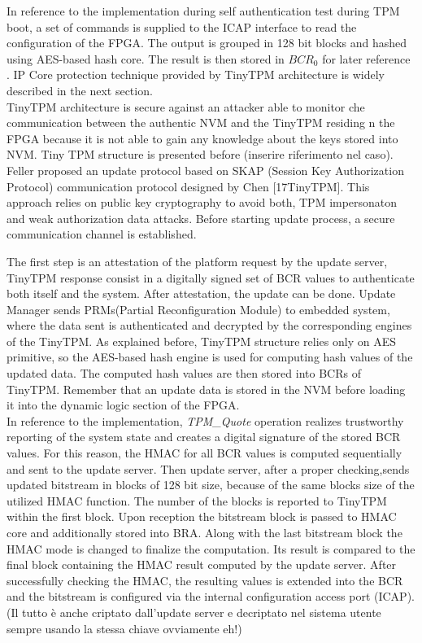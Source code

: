 \documentclass[../tesi.tex]{subfiles}
\begin{document}
{In reference to the implementation during self authentication test during TPM boot, a set of commands is supplied to the ICAP interface to read the configuration of the FPGA. The output is grouped in 128 bit blocks and hashed using AES-based hash core. The result is then stored in $BCR_0$ for later reference\\. 
IP Core protection technique provided by TinyTPM architecture is widely described in the next section. \\
TinyTPM architecture is secure against an attacker able to monitor che communication between the authentic NVM and the TinyTPM residing n the FPGA because it is not able to gain any knowledge about the keys stored into NVM. 
Tiny TPM structure is presented before (inserire riferimento nel caso). Feller proposed an update protocol based on SKAP (Session Key Authorization Protocol) communication protocol designed by Chen [17TinyTPM]. This approach relies on public key cryptography to avoid both, TPM impersonaton and weak authorization data attacks. Before starting update process, a secure communication channel is established. 

The first step is an attestation of the platform request by the update server, TinyTPM response consist in a digitally signed set of BCR values to authenticate both itself and the system. After attestation, the update can be done. Update Manager sends PRMs(Partial Reconfiguration Module) to embedded system, where the data sent is authenticated and decrypted by the corresponding engines of the TinyTPM. As explained before, TinyTPM structure relies only on AES primitive, so the AES-based hash engine is used for computing hash values of the updated data. The computed hash values are then stored into BCRs of TinyTPM. Remember that an update data is stored in the NVM before loading it into the dynamic logic section of the FPGA. \\
In reference to the implementation, \emph{TPM\_Quote} operation realizes trustworthy reporting of the system state and creates a digital signature of  the stored BCR values. For this reason, the HMAC for all BCR values is computed sequentially and sent to the update server. Then update server, after a proper checking,sends updated bitstream in blocks of 128 bit size, because of the same blocks size of the utilized HMAC function. The number of the blocks is reported to TinyTPM within the first block. Upon reception the bitstream block is passed to HMAC core and additionally stored into BRA. Along with the last bitstream block the HMAC mode is changed to finalize the computation. Its result is compared to the final block containing the HMAC result computed by the update server. After successfully checking the HMAC, the resulting values is extended into the BCR and the bitstream is configured via the internal configuration access port (ICAP). (Il tutto è anche criptato dall'update server e decriptato nel sistema utente sempre usando la stessa chiave ovviamente eh!) 

}
\end{document}
